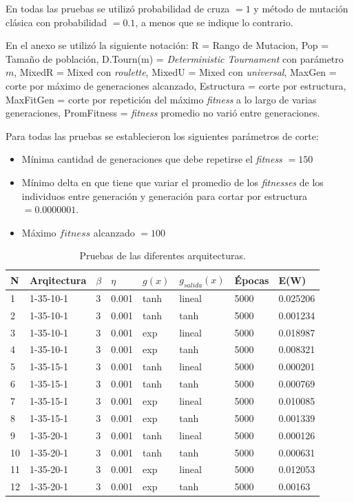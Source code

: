 \documentclass[11pt,a4paper]{article}
\begin{document}
En todas las pruebas se utilizó probabilidad de cruza $=1$ y método de mutación clásica con probabilidad $= 0.1$, a menos que se indique lo contrario.

En el anexo se utilizó la siguiente notación: R = Rango de Mutacion, Pop = Tamaño de población, D.Tourn(m) = \emph{Deterministic Tournament} con parámetro $m$, MixedR = Mixed con \emph{roulette}, MixedU = Mixed con \emph{universal}, MaxGen = corte por máximo de generaciones alcanzado, Estructura = corte por estructura, MaxFitGen = corte por repetición del máximo \emph{fitness} a lo largo de varias generaciones, PromFitness = \emph{fitness} promedio no varió entre generaciones.

Para todas las pruebas se establecieron los siguientes parámetros de corte:
\begin{itemize}
\item Mínima cantidad de generaciones que debe repetirse el \emph{fitness} $=150$
\item Mínimo delta en que tiene que variar el promedio de los \emph{fitnesses} de los individuos entre generación y generación para cortar por estructura $=0.0000001$.
\item Máximo $fitness$ alcanzado $=100$
\end{itemize}

\begin{table}[h]
\centering
\begin{tabular}{|l|l|l|l|l|l|l|l|}
\hline
N  & Arqitectura & $\beta$ & $\eta$   & $g(x)$ & $g_{salida}(x)$ & Épocas & E(W)     \\ \hline
1  & 1-35-10-1    & 3    & 0.001 & tanh & lineal      & 5000   & 0.025206 \\ \hline
2  & 1-35-10-1    & 3    & 0.001 & tanh & tanh        & 5000   & 0.001234 \\ \hline
3  & 1-35-10-1    & 3    & 0.001 & exp  & lineal      & 5000   & 0.018987 \\ \hline
4  & 1-35-10-1    & 3    & 0.001 & exp  & tanh        & 5000   & 0.008321 \\ \hline
5  & 1-35-15-1    & 3    & 0.001 & tanh & lineal      & 5000   & 0.000201 \\ \hline
6  & 1-35-15-1    & 3    & 0.001 & tanh & tanh        & 5000   & 0.000769 \\ \hline
7  & 1-35-15-1    & 3    & 0.001 & exp  & lineal      & 5000   & 0.010085 \\ \hline
8  & 1-35-15-1    & 3    & 0.001 & exp  & tanh        & 5000   & 0.001339 \\ \hline
9  & 1-35-20-1    & 3    & 0.001 & tanh & lineal      & 5000   & 0.000126 \\ \hline
10 & 1-35-20-1    & 3    & 0.001 & tanh & tanh        & 5000   & 0.000631 \\ \hline
11 & 1-35-20-1    & 3    & 0.001 & exp  & lineal      & 5000   & 0.012053 \\ \hline
12 & 1-35-20-1    & 3    & 0.001 & exp  & tanh        & 5000   & 0.00163  \\ \hline
\end{tabular}
\caption{Pruebas de las diferentes arquitecturas.}
\label{table:pruebaArqs}
\end{table}
\end{document}
